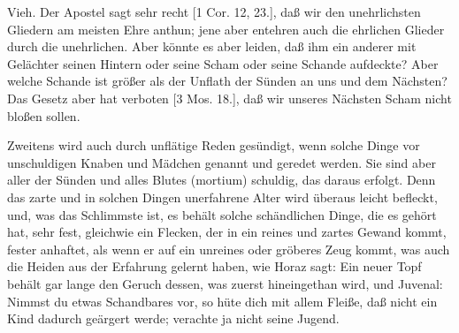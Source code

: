 Vieh. Der Apostel sagt sehr recht [1 Cor. 12, 23.], daß wir den unehrlichsten Gliedern am meisten Ehre anthun; jene aber entehren auch die ehrlichen Glieder durch die unehrlichen. Aber könnte es aber leiden, daß ihm ein anderer mit Gelächter seinen Hintern oder seine Scham oder seine Schande aufdeckte? Aber welche Schande ist größer als der Unflath der Sünden an uns und dem Nächsten? Das Gesetz aber hat verboten [3 Mos. 18.], daß wir unseres Nächsten Scham nicht bloßen sollen.

Zweitens wird auch durch unflätige Reden gesündigt, wenn solche Dinge vor unschuldigen
Knaben und Mädchen genannt und geredet werden. Sie sind aber aller der Sünden und alles Blutes (mortium) schuldig, das daraus erfolgt. Denn das zarte und in solchen Dingen unerfahrene Alter wird überaus leicht befleckt, und, was das Schlimmste ist, es behält solche schändlichen Dinge, die es gehört hat, sehr fest, gleichwie ein Flecken, der in ein reines und zartes Gewand kommt, fester anhaftet, als wenn er auf ein unreines oder gröberes Zeug kommt, was auch die Heiden aus der Erfahrung gelernt haben, wie Horaz sagt: Ein neuer Topf behält gar lange den Geruch dessen, was zuerst hineingethan wird, und Juvenal: Nimmst du etwas Schandbares vor, so hüte dich mit allem Fleiße, daß nicht ein Kind dadurch geärgert werde; verachte ja nicht seine Jugend.

